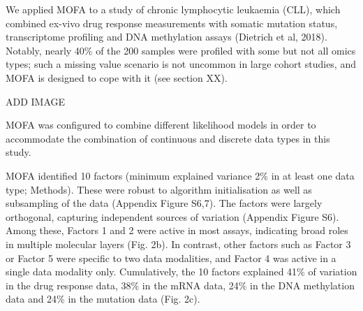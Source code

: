 We applied MOFA to a study of chronic lymphocytic leukaemia (CLL), which combined ex-vivo drug response measurements with somatic mutation status, transcriptome profiling and DNA methylation assays (Dietrich et al, 2018). Notably, nearly 40\% of the 200 samples were profiled with some but not all omics types; such a missing value scenario is not uncommon in large cohort studies, and MOFA is designed to cope with it (see section XX). 

ADD IMAGE

MOFA was configured to combine different likelihood models in order to accommodate the combination of continuous and discrete data types in this study. 

MOFA identified 10 factors (minimum explained variance 2\% in at least one data type; Methods). These were robust to algorithm initialisation as well as subsampling of the data (Appendix Figure S6,7). The factors were largely orthogonal, capturing independent sources of variation (Appendix Figure S6). Among these, Factors 1 and 2 were active in most assays, indicating broad roles in multiple molecular layers (Fig. 2b). In contrast, other factors such as Factor 3 or Factor 5 were specific to two data modalities, and Factor 4 was active in a single data modality only. Cumulatively, the 10 factors explained 41\% of variation in the drug response data, 38\% in the mRNA data, 24\% in the DNA methylation data and 24\% in the mutation data (Fig. 2c). 


